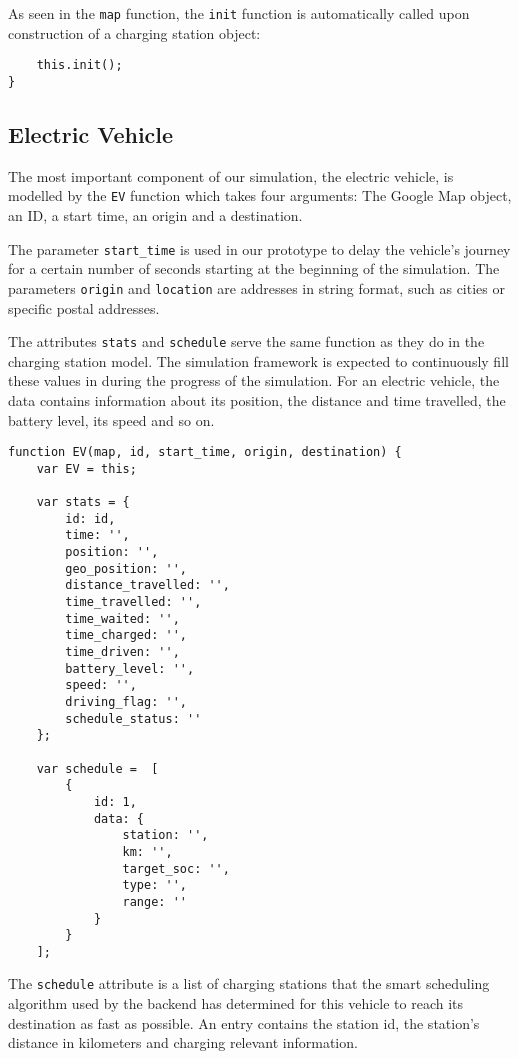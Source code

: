 As seen in the \texttt{map} function, the \texttt{init} function is automatically called upon construction of a charging station object:

\begin{verbatim}
    this.init();
}
\end{verbatim}


\newpage
\subsection{Electric Vehicle}

The most important component of our simulation, the electric vehicle, is modelled by the \texttt{EV} function which takes four arguments: The Google Map object, an ID, a start time, an origin and a destination.

The parameter \texttt{start\_time} is used in our prototype to delay the vehicle's journey for a certain number of seconds starting at the beginning of the simulation. The parameters \texttt{origin} and \texttt{location} are addresses in string format, such as cities or specific postal addresses.

The attributes \texttt{stats} and \texttt{schedule} serve the same function as they do in the charging station model. The simulation framework is expected to continuously fill these values in during the progress of the simulation. For an electric vehicle, the data contains information about its position, the distance and time travelled, the battery level, its speed and so on.

\begin{verbatim}
function EV(map, id, start_time, origin, destination) {
    var EV = this;

    var stats = {
        id: id,
        time: '',
        position: '',
        geo_position: '',
        distance_travelled: '',
        time_travelled: '',
        time_waited: '',
        time_charged: '',
        time_driven: '',
        battery_level: '',
        speed: '',
        driving_flag: '',
        schedule_status: ''
    };

    var schedule =  [
        {
            id: 1,
            data: {
                station: '',
                km: '',
                target_soc: '',
                type: '',
                range: ''
            }
        }
    ];
\end{verbatim}

The \texttt{schedule} attribute is a list of charging stations that the smart scheduling algorithm used by the backend has determined for this vehicle to reach its destination as fast as possible. An entry contains the station id, the station's distance in kilometers and charging relevant information.

